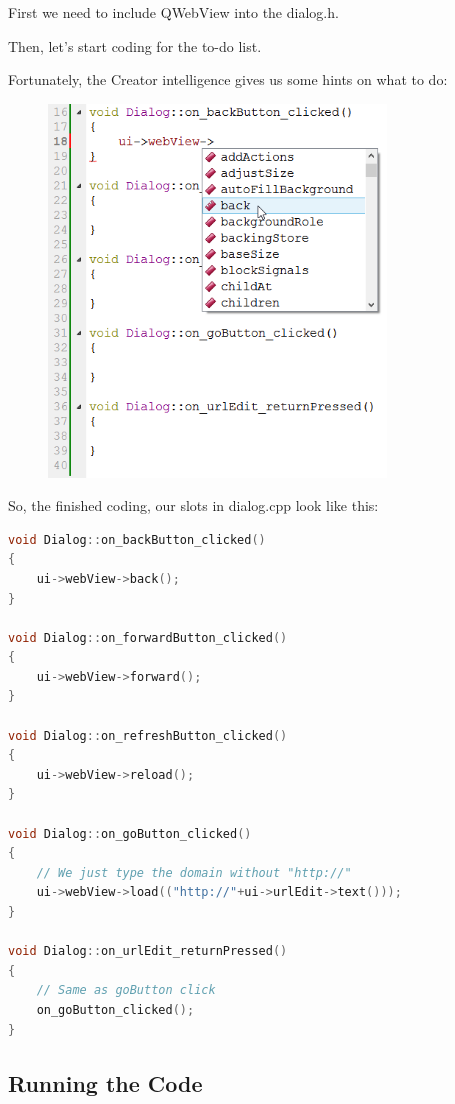 First we need to include QWebView into the dialog.h.

Then, let's start coding for the to-do list.

Fortunately, the Creator intelligence gives us some hints on what to do:

\begin{figure}[htbp]
\centering
\includegraphics[width=0.8\textwidth]{../manuscript/images/BackButtonCoding}
\caption{}
\end{figure}

So, the finished coding, our slots in dialog.cpp look like this:

\begin{lstlisting}[language=c++, numbers=none]
void Dialog::on_backButton_clicked()
{
    ui->webView->back();
}

void Dialog::on_forwardButton_clicked()
{
    ui->webView->forward();
}

void Dialog::on_refreshButton_clicked()
{
    ui->webView->reload();
}

void Dialog::on_goButton_clicked()
{
    // We just type the domain without "http://"
    ui->webView->load(("http://"+ui->urlEdit->text()));
}

void Dialog::on_urlEdit_returnPressed()
{
    // Same as goButton click
    on_goButton_clicked();
}
\end{lstlisting}

\subsection{Running the Code}\label{running-the-code}


